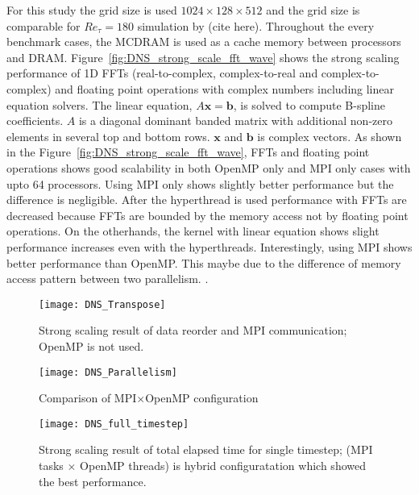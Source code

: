 For this study the grid size is used $1024\times128\times512$ and the grid size is comparable for $Re_\tau = 180$ simulation by (cite here). Throughout the every benchmark cases, the MCDRAM is used as a cache memory between processors and DRAM. Figure~\ref{fig:DNS_strong_scale_fft_wave} shows the strong scaling performance of 1D FFTs (real-to-complex, complex-to-real and complex-to-complex) and floating point operations with complex numbers including linear equation solvers. The linear equation, $A\mathbf{x} = \mathbf{b}$, is solved to compute B-spline coefficients. $A$ is a diagonal dominant banded matrix with additional non-zero elements in several top and bottom rows. $\mathbf{x}$ and $\mathbf{b}$ is complex vectors. As shown in the Figure~\ref{fig:DNS_strong_scale_fft_wave}, FFTs and floating point operations shows good scalability in both OpenMP only and MPI only cases with upto 64 processors. Using MPI only shows slightly better performance but the difference is negligible. After the hyperthread is used performance with FFTs are decreased because FFTs are bounded by the memory access not by floating point operations. On the otherhands, the kernel with linear equation shows slight performance increases even with the hyperthreads. Interestingly, using MPI shows better performance than OpenMP. This maybe due to the difference of memory access pattern between two parallelism. .


\begin{figure}[htb]
 \begin{center}
   \texttt{[image: DNS\_Transpose]}
   \caption{Strong scaling result of data reorder and MPI communication; OpenMP is not used.}
   \label{fig:DNS_strong_scale_transpose}
 \end{center}
\end{figure}

\begin{figure}[htb]
 \begin{center}
   \texttt{[image: DNS\_Parallelism]}
   \caption{Comparison of MPI$\times$OpenMP configuration}
   \label{fig:DNS_MPI_OpenMP}
 \end{center}
\end{figure}

\begin{figure}[htb]
 \begin{center}
   \texttt{[image: DNS\_full\_timestep]}
   \caption{Strong scaling result of total elapsed time for single timestep; (MPI tasks $\times$ OpenMP threads) is hybrid configuratation which showed  the best performance.}
   \label{fig:DNS_strong_scale_total_elapsed_time}
 \end{center}
\end{figure}






